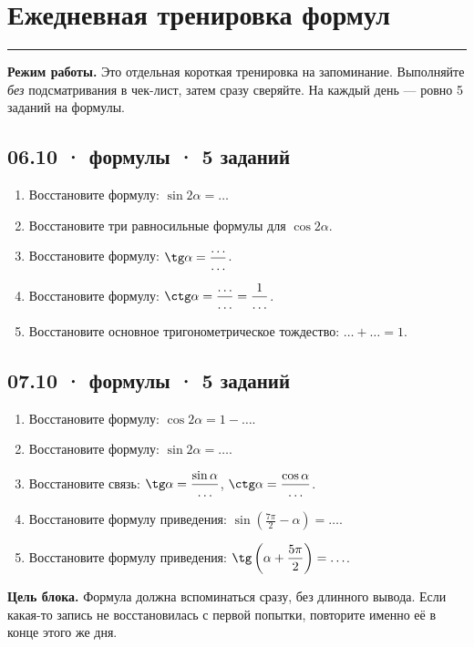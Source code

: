 \documentclass[a4paper,12pt]{article}
\newcommand{\sectionline}{\vspace{-1mm}\noindent\color{accent}\rule{\linewidth}{0.7pt}\color{textgray}\vspace{2mm}}
\newcommand{\key}[1]{\textbf{\color{darkaccent}#1}}
\begin{document}
\clearpage

\section*{Ежедневная тренировка формул}
\sectionline

\textbf{Режим работы.} Это отдельная короткая тренировка на запоминание. Выполняйте \emph{без} подсматривания в чек-лист, затем сразу сверяйте. На каждый день --- ровно 5 заданий на формулы.

\subsection*{06.10 · формулы · 5 заданий}
\begin{enumerate}[label=\textbf{Ф\arabic*.}]
  \item Восстановите формулу: \(\sin 2\alpha=\ldots\)
  \item Восстановите три равносильные формулы для \(\cos 2\alpha\).
  \item Восстановите формулу: \(\displaystyle \tg\alpha=\frac{\ldots}{\ldots}\).
  \item Восстановите формулу: \(\displaystyle \ctg\alpha=\frac{\ldots}{\ldots}=\frac{1}{\ldots}\).
  \item Восстановите основное тригонометрическое тождество: \(\ldots+\ldots=1\).
\end{enumerate}

\subsection*{07.10 · формулы · 5 заданий}
\begin{enumerate}[label=\textbf{Ф\arabic*.}]
  \item Восстановите формулу: \(\cos 2\alpha=1-\ldots\).
  \item Восстановите формулу: \(\sin 2\alpha=\ldots\).
  \item Восстановите связь: \(\displaystyle \tg\alpha=\frac{\sin\alpha}{\ldots}\), \quad \(\displaystyle \ctg\alpha=\frac{\cos\alpha}{\ldots}\).
  \item Восстановите формулу приведения: \(\displaystyle \sin\left(\frac{7\pi}{2}-\alpha\right)=\ldots\).
  \item Восстановите формулу приведения: \(\displaystyle \tg\left(\alpha+\frac{5\pi}{2}\right)=\ldots\).
\end{enumerate}

\vspace{2mm}
\key{Цель блока.} Формула должна вспоминаться сразу, без длинного вывода. Если какая-то запись не восстановилась с первой попытки, повторите именно её в конце этого же дня.
\end{document}

